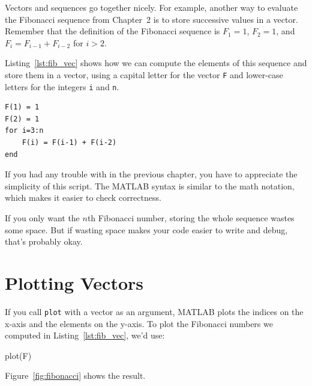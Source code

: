 
Vectors and sequences go together nicely.
For example, another way to evaluate the Fibonacci sequence from Chapter~2 is to
store successive values in a vector.  Remember that the definition of the
Fibonacci sequence is $F_1 = 1$, $F_2 = 1$, and
$F_{i} = F_{i-1} + F_{i-2}$ for $i > 2$.

Listing~\ref{lst:fib_vec} shows how we can compute the elements of this sequence and store them in a vector, using a capital letter for the vector \lstinline{F}
and lower-case letters for the integers \lstinline{i} and \lstinline{n}.

\begin{lstlisting}[caption={Calculating the Fibonacci sequence using a vector}, label={lst:fib_vec}]
F(1) = 1
F(2) = 1
for i=3:n
    F(i) = F(i-1) + F(i-2)
end
\end{lstlisting}

If you had any trouble with  in the previous chapter, you have to
appreciate the simplicity of this script.  The MATLAB syntax is
similar to the math notation, which makes it easier to check
correctness.  

If you only want the $n$th Fibonacci number, storing
the whole sequence wastes some space.  But if wasting space
makes your code easier to write and debug, that's probably okay.


\section{Plotting Vectors}


If you call \lstinline{plot} with a vector as an argument,
MATLAB plots the indices on the x-axis and the elements on the
y-axis.  To plot the Fibonacci numbers we computed in Listing~\ref{lst:fib_vec}, we'd use:

\begin{code}
plot(F)
\end{code}

Figure~\ref{fig:fibonacci} shows the result.

